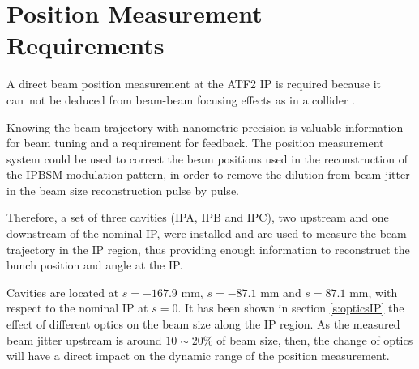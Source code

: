 \section{Position Measurement Requirements}
A direct beam position measurement at the ATF2 IP is required because it can~not be deduced from beam-beam focusing effects as in a collider \cite{Bambade:1989pb}.\par
Knowing the beam trajectory with nanometric precision is valuable information for beam tuning and a requirement for feedback. The position measurement system could be used to correct the beam positions used in the reconstruction of the IPBSM modulation pattern, in order to remove the dilution from beam jitter in the beam size reconstruction pulse by pulse.\par
Therefore, a set of three cavities (IPA, IPB and IPC), two upstream and one downstream of the nominal IP, were installed and are used to measure the beam trajectory in the IP region, thus providing enough information to reconstruct the bunch position and angle at the IP.\par
Cavities are located at $s=-167.9$ mm, $s=-87.1$ mm and $s=87.1$ mm, with respect to the nominal IP at $s=0$. It has been shown in section \ref{s:opticsIP} the effect of different optics on the beam size along the IP region. As the measured beam jitter upstream is around $10\sim20$\% of beam size, then, the change of optics will have a direct impact on the dynamic range of the position measurement.\par %
